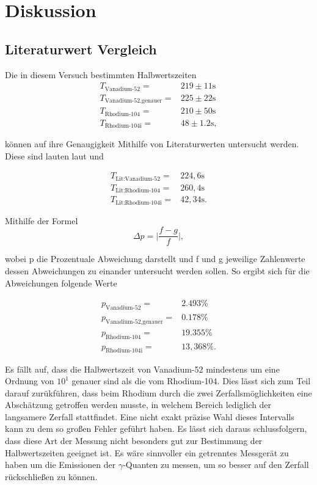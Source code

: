 \newpage
\section{Diskussion}
\label{sec:Diskussion}
\subsection{Literaturwert Vergleich}
Die in diesem Versuch bestimmten Halbwertszeiten 
\begin{align*}
    T_\text{Vanadium-52} =& 219 \pm 11 \si{\second}  \\
    T_\text{Vanadium-52,genauer} =& 225 \pm 22 \si{\second}  \\
    T_\text{Rhodium-104} =& 210 \pm 50 \si{\second} \\
    T_\text{Rhodium-104i} =& 48 \pm 1.2 \si{\second},
\end{align*}

\noindent
können auf ihre Genaugigkeit Mithilfe von Literaturwerten untersucht werden. Diese sind lauten laut \autocite{vanadium} und \autocite{rhodium}

\begin{align*}
    T_\text{Lit:Vanadium-52} =& 224,6 \si{\second}  \\
    T_\text{Lit:Rhodium-104} =& 260,4 \si{\second} \\
    T_\text{Lit:Rhodium-104i} =& 42,34  \si{\second}.
\end{align*}

\noindent 
Mithilfe der Formel 
\begin{equation*}
\Delta p = \bigg |\frac{f-g}{f} \bigg |,
\end{equation*}

\noindent
wobei p die Prozentuale Abweichung darstellt und f und g jeweilige Zahlenwerte dessen Abweichungen zu einander untersucht werden sollen. So ergibt sich für die Abweichungen folgende Werte

\begin{align*}
    p_\text{Vanadium-52} =&   2.493 \si{\percent}   \\
    p_\text{Vanadium-52,genauer} =& 0.178 \si{\percent}  \\
    p_\text{Rhodium-104} =&  19.355  \si{\percent}\\
    p_\text{Rhodium-104i} =&  13,368 \si{\percent}.
\end{align*}

\noindent
Es fällt auf, dass die Halbwertszeit von Vanadium-52 mindestens um eine Ordnung von $10^{1}$ genauer sind als die vom Rhodium-104. Dies lässt sich zum Teil darauf zurükführen,
dass beim Rhodium durch die zwei Zerfallsmöglichkeiten eine Abschätzung getroffen werden musste, in welchem Bereich lediglich der langsamere Zerfall stattfindet. Eine nicht exakt präzise
Wahl dieses Intervalls kann zu dem so großen Fehler geführt haben.
Es lässt sich daraus schlussfolgern, dass diese Art der Messung nicht besonders gut zur Bestimmung der Halbwertszeiten geeignet ist. Es wäre sinnvoller ein getrenntes Messgerät zu haben um die
Emissionen der $\gamma$-Quanten zu messen, um so besser auf den Zerfall rückschließen zu können.

